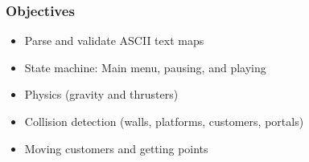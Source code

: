 \begin{frame}
    \frametitle{Objectives}
    \begin{itemize}
        \item Parse and validate ASCII text maps
        \item State machine: Main menu, pausing, and playing
        \item Physics (gravity and thrusters)
        \item Collision detection (walls, platforms, customers, portals)
        \item Moving customers and getting points
    \end{itemize}
\end{frame}
